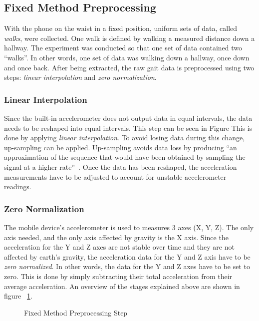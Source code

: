 \documentclass{sig-alternate}
\begin{document}
    
\subsection{Fixed Method Preprocessing}	\label{FPP}
	With the phone on the waist in a fixed position, uniform sets of data, called \textit{walks}, were collected. One walk is defined by walking a measured distance down a hallway. The experiment was conducted so that one set of data contained two ``walks''. In other words, one set of data was walking down a hallway, once down and once back. After being extracted, the raw gait data is preprocessed using two steps: \textit{linear interpolation} and \textit{zero normalization}. 
			
\subsubsection{Linear Interpolation} \label{LI}
	Since the built-in accelerometer does not output data in equal intervals, the data needs to be reshaped into equal intervals. This step can be seen in Figure This is done by applying \textit{linear interpolation}. To avoid losing data during this change, up-sampling can be applied. Up-sampling avoids data loss by producing ``an approximation of the sequence that would have been obtained by sampling the signal at a higher rate''~\cite{wiki1:2014}. Once the data has been reshaped, the acceleration measurements have to be adjusted to account for unstable accelerometer readings. 
			
\subsubsection{Zero Normalization}
	The mobile device's accelerometer is used to measures 3 axes (X, Y, Z). The only axis needed, and the only axis affected by gravity is the X axis. Since the acceleration for the Y and Z axes are not stable over time and they are not affected by earth's gravity, the acceleration data for the Y and Z axis have to be \textit{zero normalized}. In other words, the data for the Y and Z axes have to be set to zero. This is done by simply subtracting their total acceleration from their average acceleration. An overview of the stages explained above are shown in figure ~\ref{fig:firstStep}.
	
\begin{figure}
\centering
{}
\caption{Fixed Method Preprocessing Step}
\label{fig:firstStep}
\end{figure}
\end{document}
